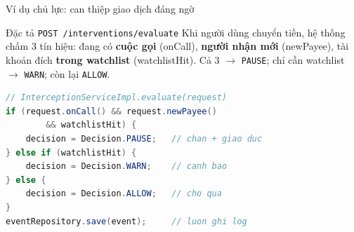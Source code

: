 \documentclass[aspectratio=169,12pt]{beamer}
\begin{document}
\begin{frame}[fragile]{Ví dụ chủ lực: can thiệp giao dịch đáng ngờ}
  \begin{block}{Đặc tả \texttt{POST /interventions/evaluate}}
    Khi người dùng chuyển tiền, hệ thống chấm 3 tín hiệu: đang có
    \textbf{cuộc gọi} (onCall), \textbf{người nhận mới} (newPayee),
    tài khoản đích \textbf{trong watchlist} (watchlistHit).
    Cả 3 $\to$ \texttt{PAUSE}; chỉ cần watchlist $\to$ \texttt{WARN};
    còn lại \texttt{ALLOW}.
  \end{block}

\begin{lstlisting}[language=java]
// InterceptionServiceImpl.evaluate(request)
if (request.onCall() && request.newPayee()
        && watchlistHit) {
    decision = Decision.PAUSE;   // chan + giao duc
} else if (watchlistHit) {
    decision = Decision.WARN;    // canh bao
} else {
    decision = Decision.ALLOW;   // cho qua
}
eventRepository.save(event);     // luon ghi log
\end{lstlisting}
\end{frame}
\end{document}
